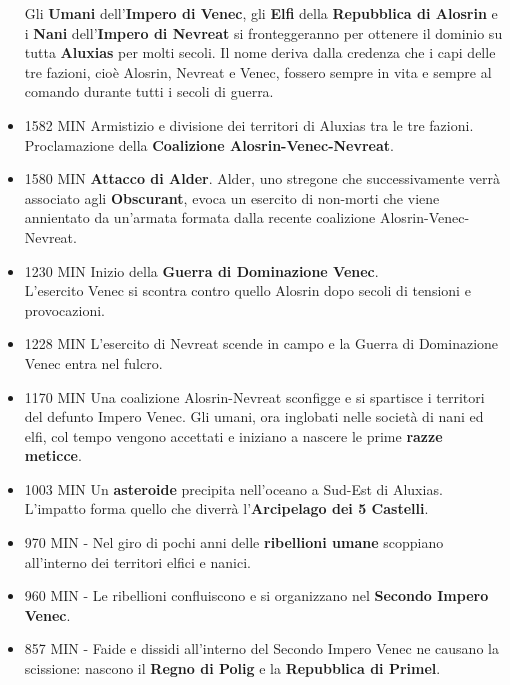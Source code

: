 \documentclass[10pt,twoside,onecolumn,openany]{book}
\begin{document}
\begin{multicols}{2}
\begin{itemize}
Gli \textbf{Umani} dell'\textbf{Impero di Venec}, gli \textbf{Elfi} della \textbf{Repubblica di Alosrin} e i \textbf{Nani} dell'\textbf{Impero di Nevreat} si fronteggeranno per ottenere il dominio su tutta \textbf{Aluxias} per molti secoli. Il nome deriva dalla credenza che i capi delle tre fazioni, cioè Alosrin, Nevreat e Venec, fossero sempre in vita e sempre al comando durante tutti i secoli di guerra.\\
\item 1582 MIN Armistizio e divisione dei territori di Aluxias tra le tre fazioni. Proclamazione della \textbf{Coalizione Alosrin-Venec-Nevreat}.\\
\item 1580 MIN \textbf{Attacco di Alder}. Alder, uno stregone che successivamente verrà associato agli \textbf{Obscurant}, evoca un esercito di non-morti che viene annientato da un'armata formata dalla recente coalizione Alosrin-Venec-Nevreat.\\
\item 1230 MIN Inizio della \textbf{Guerra di Dominazione Venec}.\\ L'esercito Venec si scontra contro quello Alosrin dopo secoli di tensioni e provocazioni.\\
\item 1228 MIN L'esercito di Nevreat scende in campo e la Guerra di Dominazione Venec entra nel fulcro.\\
\item 1170 MIN Una coalizione Alosrin-Nevreat sconfigge e si spartisce i territori del defunto Impero Venec. Gli umani, ora inglobati nelle società di nani ed elfi, col tempo vengono accettati e iniziano a nascere le prime \textbf{razze meticce}.\\
\item 1003 MIN Un \textbf{asteroide} precipita nell'oceano a Sud-Est di Aluxias. L'impatto forma quello che diverrà l'\textbf{Arcipelago dei 5 Castelli}. \\
\item 970 MIN - Nel giro di pochi anni delle \textbf{ribellioni umane} scoppiano all'interno dei territori elfici e nanici.\\
\item 960 MIN - Le ribellioni confluiscono e si organizzano nel \textbf{Secondo Impero Venec}.\\
\item 857 MIN - Faide e dissidi all'interno del Secondo Impero Venec ne causano la scissione: nascono il \textbf{Regno di Polig} e la \textbf{Repubblica di Primel}.\\

\end{itemize}
\end{multicols}
\end{document}
